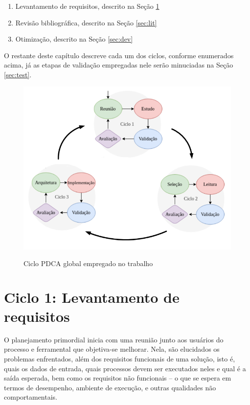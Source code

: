 \documentclass[cic,tc]{iiufrgs}
\begin{document}
\begin{enumerate}
    \item Levantamento de requisitos, descrito na Seção \ref{sec:plan}
    \item Revisão bibliográfica, descrito na Seção \ref{sec:lit}
    \item Otimização, descrito na Seção \ref{sec:dev}
\end{enumerate}

O restante deste capítulo descreve cada um dos ciclos, conforme enumerados
acima, já as etapas de validação empregadas nele serão minuciadas na Seção
\ref{sec:test}.

\begin{figure}[H] \caption{Ciclo PDCA global empregado no trabalho} \begin{center}
\includegraphics[width=0.85\linewidth]{img/pdca_global.png} \end{center}
 \label{fig:pdca_global} \end{figure}

\section{Ciclo 1: Levantamento de requisitos}
\label{sec:plan}

O planejamento primordial inicia com uma reunião junto aos usuários do processo
e ferramental que objetiva-se melhorar. Nela, são elucidados os problemas
enfrentados, além dos requisitos funcionais de uma solução, isto é, quais os
dados de entrada, quais processos devem ser executados neles e qual é a saída
esperada, bem como os requisitos não funcionais -- o que se espera em termos de
desempenho, ambiente de execução, e outras qualidades não comportamentais. 
\end{document}
